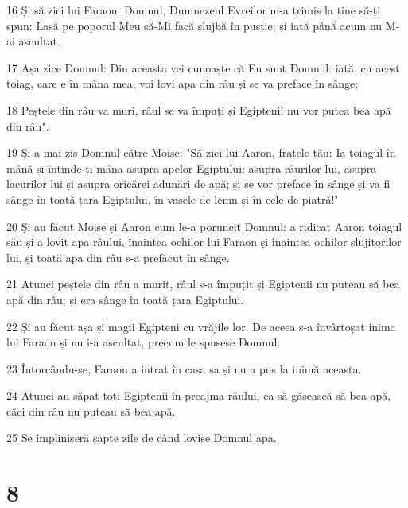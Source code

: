 \par 16 Și să zici lui Faraon: Domnul, Dumnezeul Evreilor m-a trimis la tine să-ți spun: Lasă pe poporul Meu să-Mi facă slujbă în pustie; și iată până acum nu M-ai ascultat.
\par 17 Așa zice Domnul: Din aceasta vei cunoaște că Eu sunt Domnul: iată, cu acest toiag, care e în mâna mea, voi lovi apa din râu și se va preface în sânge;
\par 18 Peștele din râu va muri, râul se va împuți și Egiptenii nu vor putea bea apă din râu".
\par 19 Și a mai zis Domnul către Moise: "Să zici lui Aaron, fratele tău: Ia toiagul în mână și întinde-ți mâna asupra apelor Egiptului: asupra râurilor lui, asupra lacurilor lui și asupra oricărei adunări de apă; și se vor preface în sânge și va fi sânge în toată țara Egiptului, în vasele de lemn și în cele de piatră!"
\par 20 Și au făcut Moise și Aaron cum le-a poruncit Domnul: a ridicat Aaron toiagul său și a lovit apa râului, înaintea ochilor lui Faraon și înaintea ochilor slujitorilor lui, și toată apa din râu s-a prefăcut în sânge.
\par 21 Atunci peștele din râu a murit, râul s-a împuțit și Egiptenii nu puteau să bea apă din râu; și era sânge în toată țara Egiptului.
\par 22 Și au făcut așa și magii Egipteni cu vrăjile lor. De aceea s-a învârtoșat inima lui Faraon și nu i-a ascultat, precum le spusese Domnul.
\par 23 Întorcându-se, Faraon a intrat în casa sa și nu a pus la inimă aceasta.
\par 24 Atunci au săpat toți Egiptenii în preajma râului, ca să găsească să bea apă, căci din râu nu puteau să bea apă.
\par 25 Se împliniseră șapte zile de când lovise Domnul apa.

\chapter{8}

